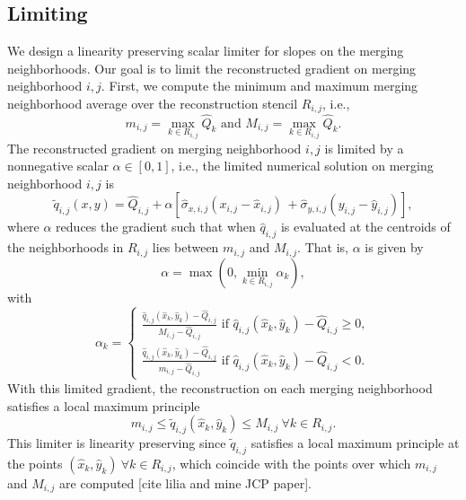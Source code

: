 \subsection{Limiting}
We design a linearity preserving scalar limiter for slopes on the merging neighborhoods.  
Our goal is to limit the reconstructed gradient on merging neighborhood $i,j$.
First, we compute the minimum and maximum merging neighborhood average over the reconstruction stencil $R_{i,j}$, i.e., 
\begin{equation}
     m_{i,j} = \max_{k \in R_{i,j}} \widehat{Q}_k \text{ and } M_{i,j} = \max_{k \in R_{i,j}} \widehat{Q}_k.
\end{equation}
The reconstructed gradient on merging neighborhood $i,j$ is limited by a nonnegative scalar $\alpha \in [0,1]$, i.e., the limited numerical solution on merging neighborhood $i,j$ is
\begin{equation}
    \tilde q_{i,j}(x,y) = \widehat{Q}_{i,j} + \alpha [\widehat{\sigma}_{x,i,j} ( x_{i,j} - \widehat x_{i,j}) \, 
   + \widehat{\sigma}_{y,i,j}( y_{i,j} - \widehat y_{i,j})],
\end{equation}
where $\alpha$ reduces the gradient such that when $\widehat{q}_{i,j}$ is evaluated at the centroids of the neighborhoods in $R_{i,j}$ lies between $m_{i,j}$ and $M_{i,j}$.
That is, $\alpha$ is given by
$$
\alpha = \max\left(0,\min_{k \in R_{i,j}} \alpha_k \right),
$$
with
\begin{equation}
    \alpha_k = \begin{cases}
    \frac{\widehat{q}_{i,j}(\widehat x_{k}, \widehat y_{k}) - \widehat{Q}_{i,j}}{M_{i,j} - \widehat{Q}_{i,j}} \text{ if } \widehat{q}_{i,j}(\widehat x_{k}, \widehat y_{k}) - \widehat{Q}_{i,j} \geq 0,\\
     \frac{\widehat{q}_{i,j}(\widehat x_{k}, \widehat y_{k}) - \widehat{Q}_{i,j}}{m_{i,j} - \widehat{Q}_{i,j}} \text{ if } \widehat{q}_{i,j}(\widehat x_{k}, \widehat y_{k}) - \widehat{Q}_{i,j} < 0.
    \end{cases}
\end{equation}
With this limited gradient, the reconstruction on each merging neighborhood satisfies a local maximum principle
$$
m_{i,j} \leq \tilde{q}_{i,j}(\widehat x_k, \widehat y_k) \leq M_{i,j} ~ \forall k \in R_{i,j}.
$$
This limiter is linearity preserving since $\tilde{q}_{i,j}$ satisfies a local maximum principle at the points $(\widehat x_k, \widehat y_k) ~\forall k \in R_{i,j}$, which coincide with the points over which $m_{i,j}$ and $M_{i,j}$ are computed [cite lilia and mine JCP paper].

